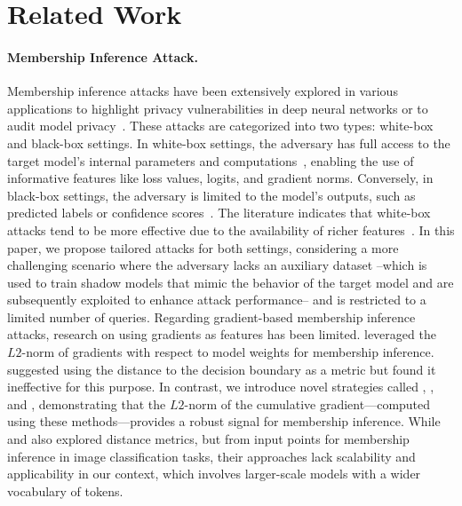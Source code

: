 \section{Related Work}
\label{sec:related_work}
\vspace{-0.15in}

\paragraph{Membership Inference Attack.} 
Membership inference attacks have been extensively explored in various applications to highlight privacy vulnerabilities in deep neural networks or to audit model privacy~\citep{shokri2017membership}. These attacks are categorized into two types: white-box and black-box settings. In white-box settings, the adversary has full access to the target model's internal parameters and computations~\citep{carlini2022membership, yeom2018privacy, nasr2019comprehensive, rezaei2021difficulty, sablayrolles19a, li2021membership}, enabling the use of informative features like loss values, logits, and gradient norms. Conversely, in black-box settings, the adversary is limited to the model's outputs, such as predicted labels or confidence scores~\citep{choquette2021label, shokri2017membership, salem2018ml, sablayrolles19a, song2021systematic, hui2021practical}. The literature indicates that white-box attacks tend to be more effective due to the availability of richer features~\citep{song2019privacy,nasr2019comprehensive}. In this paper, we propose tailored attacks for both settings, considering a more challenging scenario where the adversary lacks an auxiliary dataset --which is used to train shadow models that mimic the behavior of the target model and are subsequently exploited to enhance attack performance-- and is restricted to a limited number of queries. Regarding gradient-based membership inference attacks, research on using gradients as features has been limited. \citet{nasr2019comprehensive} leveraged the $L2$-norm of gradients with respect to model weights for membership inference. \citet{rezaei2021difficulty} suggested using the distance to the decision boundary as a metric but found it ineffective for this purpose. In contrast, we introduce novel strategies called \atkFL, \atkFLLoRA, and \atkIG, demonstrating that the $L2$-norm of the cumulative gradient—computed using these methods—provides a robust signal for membership inference. While \citet{maini2021dataset} and \citet{li2021membership} also explored distance metrics, but from input points for membership inference in image classification tasks, their approaches lack scalability and applicability in our context, which involves larger-scale models with a wider vocabulary of tokens.

